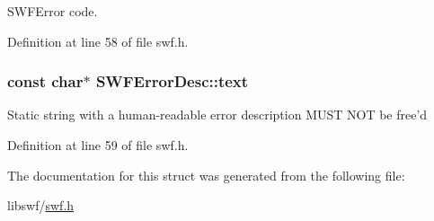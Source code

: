 S\-W\-F\-Error code. 



Definition at line 58 of file swf.\-h.

\hypertarget{struct_s_w_f_error_desc_ae8e679264f1fce07de9795638f760ca0}{
\subsubsection[{text}]{\setlength{\rightskip}{0pt plus 5cm}const char$\ast$ S\-W\-F\-Error\-Desc\-::text}}\label{struct_s_w_f_error_desc_ae8e679264f1fce07de9795638f760ca0}
Static string with a human-\/readable error description M\-U\-S\-T N\-O\-T be free'd 

Definition at line 59 of file swf.\-h.



The documentation for this struct was generated from the following file\-:\begin{DoxyCompactItemize}
\item 
libswf/\hyperlink{swf_8h}{swf.\-h}\end{DoxyCompactItemize}
